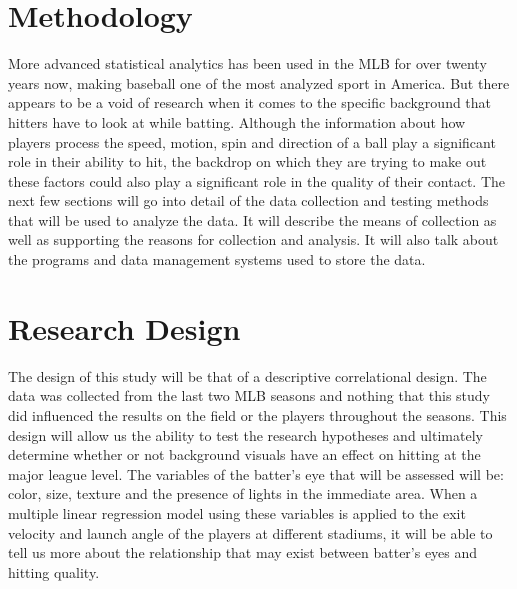 \documentclass{article}
\begin{document}
\begin{doublespace}
\section{Methodology}
More advanced statistical analytics has been used in the MLB for over twenty years now, making baseball one of the most analyzed sport in America. But there appears to be a void of research when it comes to the specific background that hitters have to look at while batting. Although the information about how players process the speed, motion, spin and direction of a ball play a significant role in their ability to hit, the backdrop on which they are trying to make out these factors could also play a significant role in the quality of their contact. The next few sections will go into detail of the data collection and testing methods that will be used to analyze the data. It will describe the means of collection as well as supporting the reasons for collection and analysis. It will also talk about the programs and data management systems used to store the data.

\section{Research Design}
The design of this study will be that of a descriptive correlational design. The data was collected from the last two MLB seasons and nothing that this study did influenced the results on the field or the players throughout the seasons. This design will allow us the ability to test the research hypotheses and ultimately determine whether or not background visuals have an effect on hitting at the major league level. The variables of the batter’s eye that will be assessed will be: color, size, texture and the presence of lights in the immediate area. When a multiple linear regression model using these variables is applied to the exit velocity and launch angle of the players at different stadiums, it will be able to tell us more about the relationship that may exist between batter’s eyes and hitting quality.


\end{doublespace}
\end{document}

